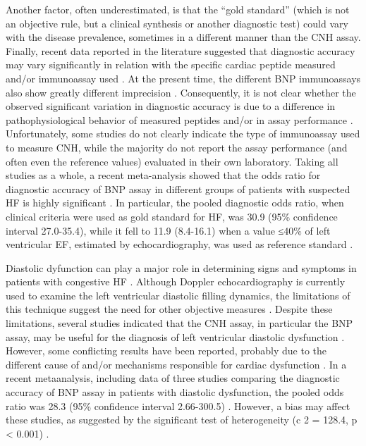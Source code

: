 \documentclass[14pt,a4paper,onecolumn]{extarticle}
\begin{document}
Another factor, often underestimated, is that the “gold standard” (which is not an objective rule, but a clinical synthesis or another diagnostic test) could vary with the disease
prevalence, sometimes in a different manner than the CNH assay.
Finally, recent data reported in the literature suggested that diagnostic accuracy may
vary significantly in relation with the specific cardiac peptide measured and/or
immunoassay used \citep{bib35} \citep{bib319} \citep{bib321} \citep{bib372} \citep{bib3129} \citep{bib3130} \citep{bib3131}. At the present time, the different BNP
immunoassays also show greatly different imprecision \citep{bib3132}. Consequently, it is not
clear whether the observed significant variation in diagnostic accuracy is due to a difference in pathophysiological behavior of measured peptides and/or in assay performance \citep{bib35}. Unfortunately, some studies do not clearly indicate the type of immunoassay used to measure CNH, while the majority do not report the assay performance (and
often even the reference values) evaluated in their own laboratory.
Taking all studies as a whole, a recent meta-analysis showed that the odds ratio for
diagnostic accuracy of BNP assay in different groups of patients with suspected HF is
highly significant \citep{bib372}. In particular, the pooled diagnostic odds ratio, when clinical
criteria were used as gold standard for HF, was 30.9 (95\% confidence interval 27.0-35.4),
while it fell to 11.9 (8.4-16.1) when a value ≤40\% of left ventricular EF, estimated by
echocardiography, was used as reference standard \citep{bib372}.

Diastolic dyfunction can play a major role in determining signs and symptoms in
patients with congestive HF \citep{bib365} \citep{bib3120} \citep{bib3121}. Although Doppler echocardiography is currently used to examine the left ventricular diastolic filling dynamics, the limitations of
this technique suggest the need for other objective measures \citep{bib3122}. Despite these limitations, several studies indicated that the CNH assay, in particular the BNP assay, may
be useful for the diagnosis of left ventricular diastolic dysfunction \citep{bib3123} \citep{bib3125} \citep{bib3126}. However, some conflicting results have been reported, probably due to the different cause of
and/or mechanisms responsible for cardiac dysfunction \citep{bib3127} \citep{bib3128}. In a recent metaanalysis, including data of three studies comparing the diagnostic accuracy of BNP
assay in patients with diastolic dysfunction, the pooled odds ratio was 28.3 (95\% confidence interval 2.66-300.5) \citep{bib372}. However, a bias may affect these studies, as suggested
by the significant test of heterogeneity (c 2 = 128.4, p < 0.001) \citep{bib372}.
\end{document}
